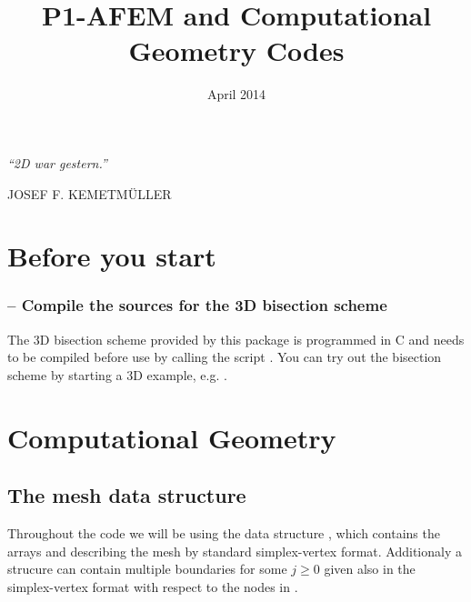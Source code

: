 \documentclass[twoside,11pt,a4paper]{article} %
\begin{document}
\newcommand{\grad}{\nabla}
\DeclarePairedDelimiter{\norm}{\lVert}{\rVert}

\title{P1-AFEM and Computational Geometry Codes}
  \date{April 2014}
\maketitle
\newlength\longest
\null\vfill

\settowidth{}
\begin{center}
\parbox{\longest}{%
  \raggedright{\Large\itshape%
   \enquote{2D war gestern.}
  \par\bigskip
  }   
  \raggedleft\large\MakeUppercase{Josef F. Kemetmüller}\par%
}
\end{center}

\vfill\vfill
\tableofcontents

\clearpage

\section{Before you start}
\subsubsection*{\texorpdfstring{ --}{} Compile the sources for the 3D bisection scheme}
The 3D bisection scheme provided by this package is programmed in C and needs to be compiled before use by calling the script .
You can try out the bisection scheme by starting a 3D example, e.g. .

\section{Computational Geometry}
\subsection{The mesh data structure}
Throughout the code we will be using the data structure , which contains the arrays  and  describing the mesh by standard simplex-vertex format. Additionaly a strucure  can contain multiple boundaries  for some ${j}\geq0$ given also in the simplex-vertex format with respect to the nodes in .
\end{document}
